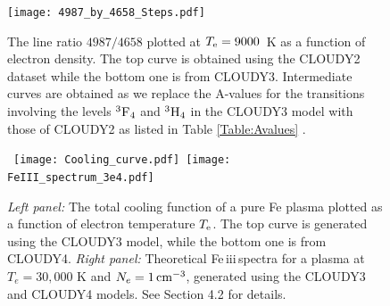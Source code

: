 \documentclass{emulateapj}
\newcommand\fe{Fe\,{\sc iii}\,}
\begin{document}


\begin{figure}[h!]
  \centering 

\texttt{[image: 4987\_by\_4658\_Steps.pdf]} 
\caption{The line ratio $4987/4658$ plotted at $T_{\rm e}=9000$~K as a function of electron density. The top curve is obtained using the CLOUDY2 dataset while the bottom one is from CLOUDY3. Intermediate curves are obtained as we replace the A-values for the transitions involving the levels $\rm ^3F_4$ and $\rm ^3H_4$ in the CLOUDY3 model with those of CLOUDY2 as listed in Table \ref{Table:Avalues} . }\label{fig:10}
\end{figure}









\begin{figure}[h!]
\centering 
\hbox{
\texttt{[image: Cooling\_curve.pdf]} 
\texttt{[image: FeIII\_spectrum\_3e4.pdf]} 
}\caption{{\it Left panel:} The total cooling function of a pure Fe plasma plotted as a function of electron temperature $T_{\rm e}$. The top curve is generated using the CLOUDY3 model, while the bottom one is from CLOUDY4. {\it Right panel:} Theoretical
 \fe spectra for a plasma at $T_{e}=30,000$ K and $N_{e}=1 \, \rm cm^{-3}$, generated using the CLOUDY3 and CLOUDY4 models.
See Section 4.2 for details.}\label{fig:11}
\end{figure}







\end{document}
